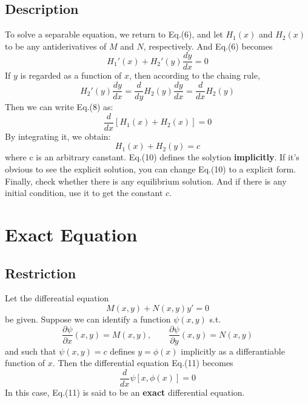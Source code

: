 \documentclass{article}
\begin{document}
\subsection{Description}
To solve a separable equation, we return to Eq.(6), and let $H_1(x)$ and $H_2(x)$ to be any antiderivatives of $M$ and $N$, respectively. And Eq.(6) becomes
\begin{equation}
	H_1'(x) +H_2'(y)\frac{dy}{dx} = 0
\end{equation}
If $y$ is regarded as a function of $x$, then according to the chaing rule,
\[H_2'(y)\frac{dy}{dx} = \frac{d}{dy}H_2(y)\frac{dy}{dx} = \frac{d}{dx}H_2(y) \]
Then we can write Eq.(8) as:
\begin{equation}
	\frac{d}{dx}\left[ H_1(x)+H_2(x) \right] = 0
\end{equation}
By integrating it, we obtain:
\begin{equation}
	H_1(x)+H_2(y) = c
\end{equation}
where c is an arbitrary canstant. Eq.(10) defines the solytion \textbf{implicitly}. If it's obvious to see the explicit solution, you can change Eq.(10) to a explicit form.\\

Finally, check whether there is any equilibrium solution. And if there is any initial condition, use it to get the constant $c$.

\section{Exact Equation}
\subsection{Restriction}
Let the differeatial equation
\begin{equation}
	M(x,y)+N(x,y)y' = 0
\end{equation}
be given. Suppose we can identify a function $\psi(x,y)$ s.t.
\begin{equation}
	\frac{\partial\psi}{\partial x}(x,y) = M(x,y),\qquad\frac{\partial\psi}{\partial y}(x,y) = N(x,y)
\end{equation}
and such that $\psi(x,y)=c$ defines $y=\phi(x)$ implicitly as a differantiable function of $x$. Then the differential equation Eq.(11) becomes
\begin{equation}
	\frac{d}{dx}\psi\left[x, \phi(x)\right] = 0
\end{equation}
In this case, Eq.(11) is said to be an \textbf{exact} differential equation.
\end{document}
